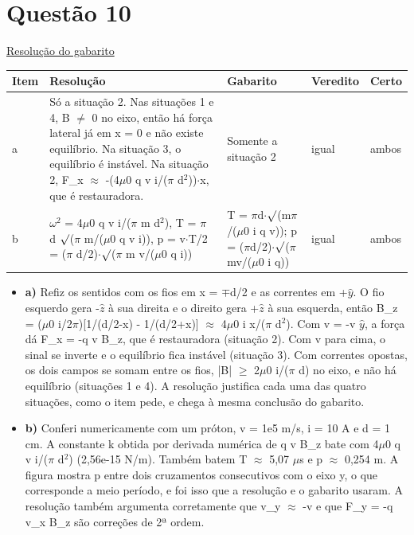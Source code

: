 \documentclass{article}%
\begin{document}
\section*{Questão 10}%
\href{https://poliedroresolve.sistemapoliedro.com.br/vestibulares/ime/2027/ime-2-fase-dia-2-27-10-2026-2-fase-dia-2/dissertativa-10-fisica-2-fase-dia-2-ime-2027}{Resolução do gabarito}\par\smallskip%
\begin{longtable}{@{}p{} p{} p{} p{} p{}@{}}\toprule Item & Resolução & Gabarito & Veredito & Certo \\ \midrule
a & Só a situação 2. Nas situações 1 e 4, B $\neq$ 0 no eixo, então há força lateral já em x = 0 e não existe equilíbrio. Na situação 3, o equilíbrio é instável. Na situação 2, F\_x $\approx$ -(4$\mu$0 q v i/($\pi$ d$^2$))$\cdot$x, que é restauradora. & Somente a situação 2 & igual & ambos \\
b & $\omega$$^2$ = 4$\mu$0 q v i/($\pi$ m d$^2$), T = $\pi$ d $\surd$($\pi$ m/($\mu$0 q v i)), p = v$\cdot$T/2 = ($\pi$ d/2)$\cdot$$\surd$($\pi$ m v/($\mu$0 q i)) & T = $\pi$d$\cdot$$\surd$(m$\pi$/($\mu$0 i q v)); p = ($\pi$d/2)$\cdot$$\surd$($\pi$mv/($\mu$0 i q)) & igual & ambos \\
\bottomrule\end{longtable}%
\begin{itemize}%
\item%
\textbf{a)} Refiz os sentidos com os fios em x = $\mp$d/2 e as correntes em +$\hat y$. O fio esquerdo gera -$\hat z$ à sua direita e o direito gera +$\hat z$ à sua esquerda, então B\_z = ($\mu$0 i/2$\pi$){[}1/(d/2-x) - 1/(d/2+x){]} $\approx$ 4$\mu$0 i x/($\pi$ d$^2$). Com v = -v $\hat y$, a força dá F\_x = -q v B\_z, que é restauradora (situação 2). Com v para cima, o sinal se inverte e o equilíbrio fica instável (situação 3). Com correntes opostas, os dois campos se somam entre os fios, |B| $\geq$ 2$\mu$0 i/($\pi$ d) no eixo, e não há equilíbrio (situações 1 e 4). A resolução justifica cada uma das quatro situações, como o item pede, e chega à mesma conclusão do gabarito.%
\item%
\textbf{b)} Conferi numericamente com um próton, v = 1e5 m/s, i = 10 A e d = 1 cm. A constante k obtida por derivada numérica de q v B\_z bate com 4$\mu$0 q v i/($\pi$ d$^2$) (2,56e{-}15 N/m). Também batem T $\approx$ 5,07 $\mu$s e p $\approx$ 0,254 m. A figura mostra p entre dois cruzamentos consecutivos com o eixo y, o que corresponde a meio período, e foi isso que a resolução e o gabarito usaram. A resolução também argumenta corretamente que v\_y $\approx$ -v e que F\_y = -q v\_x B\_z são correções de 2ª ordem.%
\end{itemize}%
\end{document}
